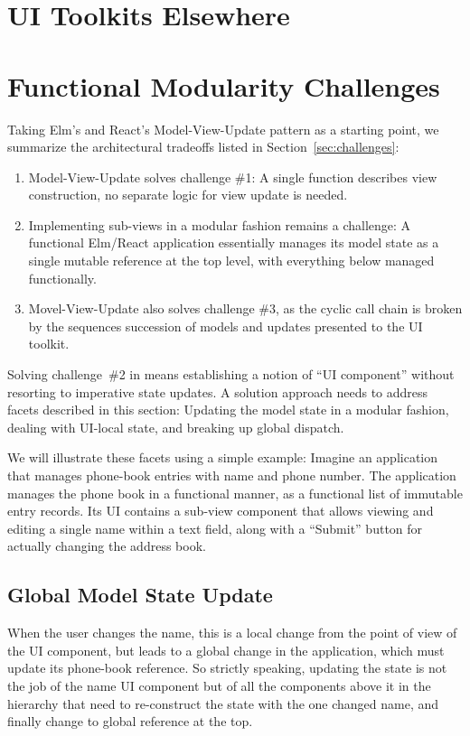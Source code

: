 \documentclass[sigplan,screen]{acmart}
\begin{document}
\section{UI Toolkits Elsewhere}

\section{Functional Modularity Challenges}

Taking Elm's and React's Model-View-Update pattern as a starting
point, we summarize the architectural tradeoffs listed in
Section~\ref{sec:challenges}:
%
\begin{enumerate}
\item Model-View-Update solves challenge \#1: A single function
  describes view construction, no separate logic for view update is
  needed.
\item Implementing sub-views in a modular fashion remains a challenge:
  A functional Elm/React application essentially manages its model
  state as a single mutable reference at the top level, with
  everything below managed functionally.
\item Movel-View-Update also solves challenge \#3, as the cyclic call
  chain is broken by the sequences succession of models and updates
  presented to the UI toolkit.
\end{enumerate}
%
Solving challenge~\#2 in means establishing a notion of ``UI
component'' without resorting to imperative state updates.  A solution
approach needs to address facets described in this section: Updating
the model state in a modular fashion, dealing with UI-local state, and
breaking up global dispatch.

We will illustrate these facets using a simple example: Imagine an
application that manages phone-book entries with name and phone
number.  The application manages the phone book in a functional
manner, as a functional list of immutable entry records.  Its UI
contains a sub-view component that allows viewing and editing a single
name within a text field, along with a ``Submit'' button for actually
changing the address book.


\subsection{Global Model State Update}

When the user changes the name, this is a local change from the point
of view of the UI component, but leads to a global change in the
application, which must update its phone-book reference.  So strictly
speaking, updating the state is not the job of the name UI component
but of all the components above it in the hierarchy that need to
re-construct the state with the one changed name, and finally change
to global reference at the top.
\end{document}
